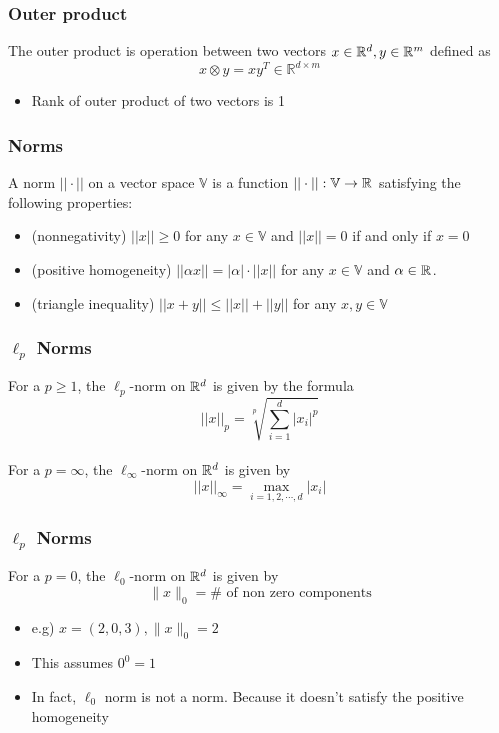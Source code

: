 \begin{frame}\frametitle{Outer product}
    The outer product is operation between two vectors $x\in{\mathbb R}^{d},y\in{\mathbb R}^{m}$ defined as
    \begin{equation*}
        x\otimes y = xy^T\in\mathbb{R}^{d\times m}
    \end{equation*}
    \begin{itemize}
        \item Rank of outer product of two vectors is 1
    \end{itemize}
\end{frame}

\begin{frame}\frametitle{Norms}
    A norm $||\cdot||$ on a vector space $\mathbb{V}$ is a function $||\cdot|| : \mathbb{V}\to{\mathbb R}^{}$ satisfying the following properties:
    \vspace*{6mm}
    \begin{itemize}
        \item (nonnegativity) $||x||\geq0$ for any $x\in \mathbb{V}$ and $||x||=0$ if and only if $x=0$
        \item (positive homogeneity) $||\alpha x|| = |\alpha|\cdot||x||$ for any $x\in\mathbb{V}$ and $\alpha\in{\mathbb R}^{}$.
        \item (triangle inequality) $||x + y||\leq||x|| + ||y||$ for any $x, y \in \mathbb{V}$
    \end{itemize}
\end{frame}

\begin{frame}\frametitle{$\ell_p$ Norms}
    For a $p\geq 1$, the $\ell_p$-norm on ${\mathbb R}^{d}$ is given by the formula
    \begin{equation*}
        ||x||_p = \sqrt[p]{\sum_{i=1}^d|x_i|^p}
    \end{equation*}\\
    \vspace{10mm}
    For a $p=\infty$, the $\ell_\infty$-norm on ${\mathbb R}^{d}$ is given by
    \begin{equation*}
        ||x||_\infty = \max_{i=1,2,\cdots,d}|x_i|
    \end{equation*}
\end{frame}

\begin{frame}\frametitle{$\ell_p$ Norms}
    For a $p=0$, the $\ell_0$-norm on ${\mathbb R}^{d}$ is given by
    \begin{equation*}
        \|x\|_0 = \#\text{ of non zero components} 
    \end{equation*}
    \begin{itemize}
        \item e.g) $x=(2,0,3), \|x\|_0=2$
        \item This assumes $0^0=1$
        \item In fact, $\ell_0$ norm is not a norm. Because it doesn't satisfy the positive homogeneity
    \end{itemize}
\end{frame}

